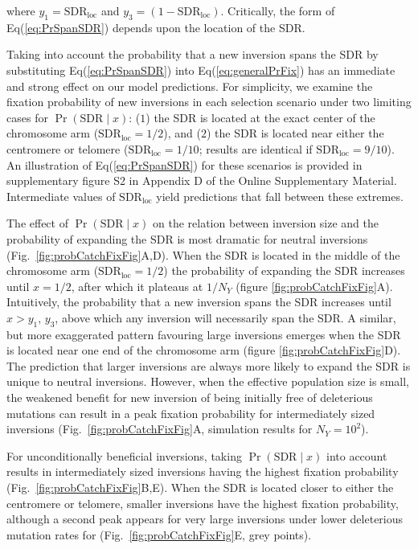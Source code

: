\documentclass{article}
\begin{document}
\noindent where $y_1 = \text{SDR}_{\text{loc}}$ and $y_3 = (1 - \text{SDR}_{\text{loc}})$. Critically, the form of Eq(\ref{eq:PrSpanSDR}) depends upon the location of the SDR. 

Taking into account the probability that a new inversion spans the SDR by substituting Eq(\ref{eq:PrSpanSDR}) into Eq(\ref{eq:generalPrFix}) has an immediate and strong effect on our model predictions. For simplicity, we examine the fixation probability of new inversions in each selection scenario under two limiting cases for $\Pr(\text{SDR} \mid x)$: ($1$) the SDR is located at the exact center of the chromosome arm ($\text{SDR}_{\text{loc}} = 1/2$), and ($2$) the SDR is located near either the centromere or telomere ($\text{SDR}_{\text{loc}} = 1/10$; results are identical if $\text{SDR}_{\text{loc}} = 9/10$). An illustration of Eq(\ref{eq:PrSpanSDR}) for these scenarios is provided in supplementary figure S2 in Appendix D of the Online Supplementary Material. Intermediate values of $\text{SDR}_{\text{loc}}$ yield predictions that fall between these extremes. 

The effect of $\Pr(\text{SDR} \mid x)$ on the relation between inversion size and the probability of expanding the SDR is most dramatic for neutral inversions (Fig.~\ref{fig:probCatchFixFig}A,D). When the SDR is located in the middle of the chromosome arm ($\text{SDR}_{\text{loc}} = 1/2$) the probability of expanding the SDR increases until $x = 1/2$, after which it plateaus at $1/N_Y$ (figure \ref{fig:probCatchFixFig}A). Intuitively, the probability that a new inversion spans the SDR increases until $x > y_1,\,y_3$, above which any inversion will necessarily span the SDR. A similar, but more exaggerated pattern favouring large inversions emerges when the SDR is located near one end of the chromosome arm (figure \ref{fig:probCatchFixFig}D). The prediction that larger inversions are always more likely to expand the SDR is unique to neutral inversions. However, when the effective population size is small, the weakened benefit for new inversion of being initially free of deleterious mutations can result in a peak fixation probability for intermediately sized inversions (Fig.~\ref{fig:probCatchFixFig}A, simulation results for $N_Y = 10^2$).

For unconditionally beneficial inversions, taking $\Pr(\text{SDR} \mid x)$ into account results in intermediately sized inversions having the highest fixation probability (Fig.~\ref{fig:probCatchFixFig}B,E). When the SDR is located closer to either the centromere or telomere, smaller inversions have the highest fixation probability, although a second peak appears for very large inversions under lower deleterious mutation rates for  (Fig.~\ref{fig:probCatchFixFig}E, grey points).
\end{document}
